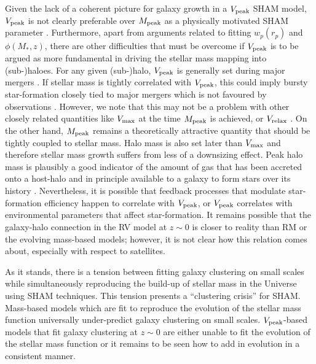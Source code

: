 \documentclass[useAMS,fleqn,usenatbib]{mnras}
\begin{document}
Given the lack of a coherent picture for galaxy growth in a $V_{\rm peak}$ SHAM model, $V_{\rm peak}$ is not clearly preferable over $M_{\rm peak}$ as a physically motivated SHAM parameter \citep[e.g. see discussion in][]{Lehmann:2017fy}.  Furthermore, apart from arguments related to fitting $w_p(r_p)$ and $\phi(M_*,z)$, there are other difficulties that must be overcome if $V_{\rm peak}$ is to be argued as more fundamental in driving the stellar mass mapping into (sub-)haloes.  For any given (sub-)halo, $V_{\rm peak}$ is generally set during major mergers \citep[1:5 or larger,][]{Behroozi:2014bg}. If stellar mass is tightly correlated with $V_{\rm peak}$, this could imply bursty star-formation closely tied to major mergers which is not favoured by observations \citep[e.g. star formation histories,][]{Diemer:2017gj}. However, we note that this may not be a problem with other closely related quantities like $V_{\rm max}$ at the time $M_{\rm peak}$ is achieved, or $V_{\rm relax}$ \citep{ChavesMontero:2015dc}.  On the other hand, $M_{\rm peak}$ remains a theoretically attractive quantity that should be tightly coupled to stellar mass. Halo mass is also set later than $V_{\rm max}$ and therefore stellar mass growth suffers from less of a downsizing effect.  Peak halo mass is plausibly a good indicator of the amount of gas that has been accreted onto a host-halo and in principle available to a galaxy to form stars over its history \citep{White:1978uk, Blumenthal:1986ie}. Nevertheless, it is possible that feedback processes that modulate star-formation efficiency happen to correlate with $V_{\rm peak}$, or $V_{\rm peak}$ correlates with environmental parameters that affect star-formation.  It remains possible that the galaxy-halo connection in the RV model at $z\sim 0$ is closer to reality than RM or the evolving mass-based models; however, it is not clear how this relation comes about, especially with respect to satellites.

As it stands, there is a tension between fitting galaxy clustering on small scales while simultaneously reproducing the build-up of stellar mass in the Universe using SHAM techniques.  This tension presents a ``clustering crisis'' for SHAM.  Mass-based models which are fit to reproduce the evolution of the stellar mass function universally under-predict galaxy clustering on small scales.  $V_{\rm peak}$-based models that fit galaxy clustering at $z\sim 0$ are either unable to fit the evolution of the stellar mass function or it remains to be seen how to add in evolution in a consistent manner.     
\end{document}
